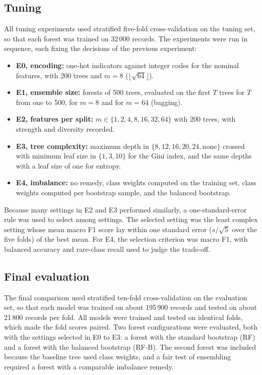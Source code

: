 \documentclass[conference,10pt]{IEEEtran}
\begin{document}
\subsection{Tuning}
All tuning experiments used stratified five-fold cross-validation on the tuning set, so that each forest was trained on 32\,000 records. The experiments were run in sequence, each fixing the decisions of the previous experiment:
\begin{itemize}
\item \textbf{E0, encoding:} one-hot indicators against integer codes for the nominal features, with 200 trees and $m=8$ ($\lfloor\sqrt{64}\rfloor$).
\item \textbf{E1, ensemble size:} forests of 500 trees, evaluated on the first $T$ trees for $T$ from one to 500, for $m=8$ and for $m=64$ (bagging).
\item \textbf{E2, features per split:} $m\in\{1,2,4,8,16,32,64\}$ with 200 trees, with strength and diversity recorded.
\item \textbf{E3, tree complexity:} maximum depth in $\{8,12,16,20,24,\text{none}\}$ crossed with minimum leaf size in $\{1,3,10\}$ for the Gini index, and the same depths with a leaf size of one for entropy.
\item \textbf{E4, imbalance:} no remedy, class weights computed on the training set, class weights computed per bootstrap sample, and the balanced bootstrap.
\end{itemize}
Because many settings in E2 and E3 performed similarly, a one-standard-error rule \cite{breiman1984cart} was used to select among settings. The selected setting was the least complex setting whose mean macro F1 score lay within one standard error ($s/\sqrt{5}$ over the five folds) of the best mean. For E4, the selection criterion was macro F1, with balanced accuracy and rare-class recall used to judge the trade-off.

\subsection{Final evaluation}
The final comparison used stratified ten-fold cross-validation on the evaluation set, so that each model was trained on about 195\,900 records and tested on about 21\,800 records per fold. All models were trained and tested on identical folds, which made the fold scores paired. Two forest configurations were evaluated, both with the settings selected in E0 to E3: a forest with the standard bootstrap (RF) and a forest with the balanced bootstrap (RF-B). The second forest was included because the baseline tree used class weights, and a fair test of ensembling required a forest with a comparable imbalance remedy.
\end{document}
